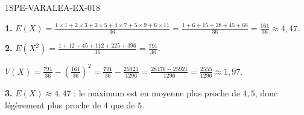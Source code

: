 \begin{corrige}{1SPE-VARALEA-EX-018}

\textbf{1.} $E(X) = \frac{1 \times 1 + 2 \times 3 + 3 \times 5 + 4 \times 7 + 5 \times 9 + 6 \times 11}{36} = \frac{1+6+15+28+45+66}{36} = \frac{161}{36} \approx 4{,}47$.

\medskip
\textbf{2.} $E(X^2) = \frac{1+12+45+112+225+396}{36} = \frac{791}{36}$.

$V(X) = \frac{791}{36} - \left(\frac{161}{36}\right)^2 = \frac{791}{36} - \frac{25921}{1296} = \frac{28476 - 25921}{1296} = \frac{2555}{1296} \approx 1{,}97$.

\medskip
\textbf{3.} $E(X) \approx 4{,}47$ : le maximum est en moyenne plus proche de $4{,}5$, donc légèrement plus proche de $4$ que de $5$.

\end{corrige}
